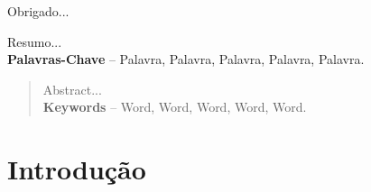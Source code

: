 \documentclass[]{politex}
\begin{document}
\begin{agradecimentos}

Obrigado...

\end{agradecimentos}



%

\begin{resumo}
Resumo...
%
\\[3\baselineskip]
%
\textbf{Palavras-Chave} -- Palavra, Palavra, Palavra, Palavra, Palavra.
\end{resumo}


\begin{abstract}
Abstract...
%
\\[3\baselineskip]
%
\textbf{Keywords} -- Word, Word, Word, Word, Word.
\end{abstract}


\listadefiguras
\listadetabelas



\sumario




	
\chapter{Introdução}
\end{document}
